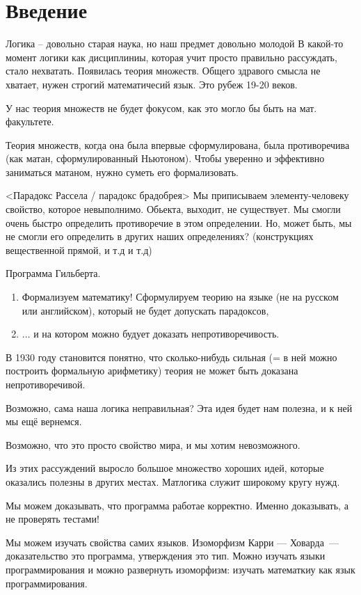 \section{Введение}

Логика -- довольно старая наука, но наш предмет довольно молодой
В какой-то момент логики как дисциплиниы, которая учит просто правильно рассуждать, стало нехватать.
Появилась теория множеств.
Общего здравого смысла не хватает, нужен строгий математичесий язык.
Это рубеж 19-20 веков.

У нас теория множеств не будет фокусом, как это могло бы быть на мат. факультете.

Теория множеств, когда она была впервые сформулирована, была противоречива (как матан, сформулированный Ньютоном).
Чтобы уверенно и эффективно заниматься матаном, нужно суметь его формализовать.

<Парадокс Рассела / парадокс брадобрея>
Мы приписываем элементу-человеку свойство, которое невыполнимо.
Обьекта, выходит, не существует.
Мы смогли очень быстро определить противоречие в этом определении.
Но, может быть, мы не смогли его определить в других наших определениях?
(конструкциях вещественной прямой, и т.д и т.д)

Программа Гильберта.
\begin{enumerate}
\item Формализуем математику!
Сформулируем теорию на языке (не на русском или английском), который не будет допускать парадоксов,
\item $\ldots$ и на котором можно будует доказать непротиворечивость.
\end{enumerate}

В 1930 году становится понятно, что сколько-нибудь сильная (= в ней можно построить формальную арифметику) теория не может быть доказана непротиворечивой.

Возможно, сама наша логика неправильная?
Эта идея будет нам полезна, и к ней мы ещё вернемся.

Возможно, что это просто свойство мира, и мы хотим невозможного.

Из этих рассуждений выросло большое множество хороших идей, которые оказались полезны в других местах.
Матлогика служит широкому кругу нужд.

Мы можем доказывать, что программа работае корректно.
Именно доказывать, а не проверять тестами!

Мы можем изучать свойства самих языков.
Изоморфизм Карри — Ховарда~--- доказательство это программа, утверждения это тип.
Можно изучать языки программирования и можно развернуть изоморфизм: изучать математкиу как язык программирования.


